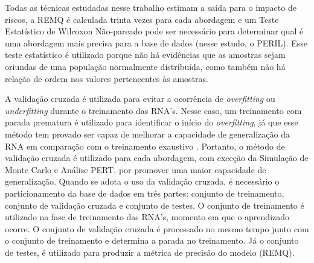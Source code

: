 Todas as técnicas estudadas nesse trabalho estimam a saída para o impacto de riscos, a REMQ é calculada trinta vezes para cada abordagem e um Teste Estatístico de Wilcoxon Não-pareado \cite{siegel1956nonparametric} pode ser necessário para determinar qual é uma abordagem mais precisa para a base de dados (nesse estudo, o PERIL). Esse teste estatístico é utilizado porque não há evidências que as amostras sejam oriundas de uma população normalmente distribuída, como também não há relação de ordem nos valores pertencentes às amostras.

A validação cruzada \cite{amari1996statistical} é utilizada para evitar a ocorrência de \textit{overfitting} ou \textit{underfitting} durante o treinamento das RNA's. Nesse caso, um treinamento com parada prematura é utilizado para identificar o início do \textit{overfitting}, já que esse método tem provado ser capaz de melhorar a capacidade de generalização da RNA em comparação com o treinamento exaustivo \cite{haykin-1994} \cite{engelbrecht2007computational} \cite{amari1996new}. Portanto, o método de validação cruzada é utilizado para cada abordagem, com exceção da Simulação de Monte Carlo e Análise PERT, por promover uma maior capacidade de generalização. Quando se adota o uso da validação cruzada, é necessário o particionamento da base de dados em três partes: conjunto de treinamento, conjunto de validação cruzada e conjunto de testes. O conjunto de treinamento é utilizado na fase de treinamento das RNA's, momento em que o aprendizado ocorre. O conjunto de validação cruzada é processado no mesmo tempo junto com o conjunto de treinamento e determina a parada no treinamento. Já o conjunto de testes, é utilizado para produzir a métrica de precisão do modelo (REMQ).

